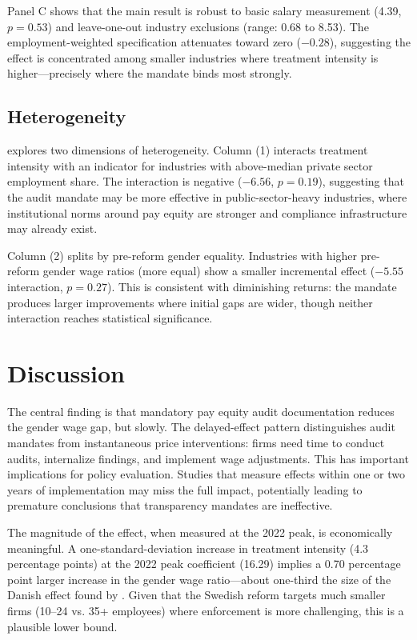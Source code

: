 \documentclass[12pt]{article}
\begin{document}
Panel C shows that the main result is robust to basic salary measurement (4.39, $p = 0.53$) and leave-one-out industry exclusions (range: 0.68 to 8.53). The employment-weighted specification attenuates toward zero ($-0.28$), suggesting the effect is concentrated among smaller industries where treatment intensity is higher---precisely where the mandate binds most strongly.

\subsection{Heterogeneity}



 explores two dimensions of heterogeneity. Column (1) interacts treatment intensity with an indicator for industries with above-median private sector employment share. The interaction is negative ($-6.56$, $p = 0.19$), suggesting that the audit mandate may be more effective in public-sector-heavy industries, where institutional norms around pay equity are stronger and compliance infrastructure may already exist.

Column (2) splits by pre-reform gender equality. Industries with higher pre-reform gender wage ratios (more equal) show a smaller incremental effect ($-5.55$ interaction, $p = 0.27$). This is consistent with diminishing returns: the mandate produces larger improvements where initial gaps are wider, though neither interaction reaches statistical significance.

\section{Discussion}
\label{sec:discussion}

The central finding is that mandatory pay equity audit documentation reduces the gender wage gap, but slowly. The delayed-effect pattern distinguishes audit mandates from instantaneous price interventions: firms need time to conduct audits, internalize findings, and implement wage adjustments. This has important implications for policy evaluation. Studies that measure effects within one or two years of implementation may miss the full impact, potentially leading to premature conclusions that transparency mandates are ineffective.

The magnitude of the effect, when measured at the 2022 peak, is economically meaningful. A one-standard-deviation increase in treatment intensity (4.3 percentage points) at the 2022 peak coefficient (16.29) implies a 0.70 percentage point larger increase in the gender wage ratio---about one-third the size of the Danish effect found by \citet{bennedsen2022firms}. Given that the Swedish reform targets much smaller firms (10--24 vs. 35+ employees) where enforcement is more challenging, this is a plausible lower bound.
\end{document}
